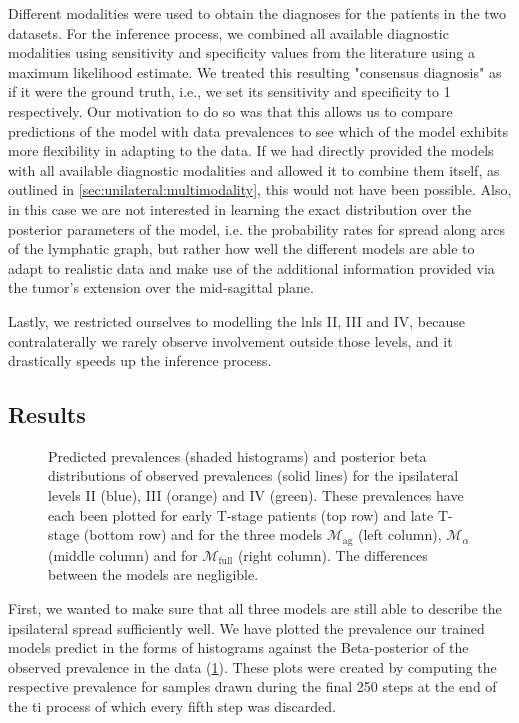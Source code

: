 \documentclass[\relativeRoot/main.tex]{subfiles}
\begin{document}
Different modalities were used to obtain the diagnoses for the patients in the two datasets. For the inference process, we combined all available diagnostic modalities using sensitivity and specificity values from the literature \cite{de_bondt_detection_2007} using a maximum likelihood estimate. We treated this resulting "consensus diagnosis" as if it were the ground truth, i.e., we set its sensitivity and specificity to 1 respectively. Our motivation to do so was that this allows us to compare predictions of the model with data prevalences to see which of the model exhibits more flexibility in adapting to the data. If we had directly provided the models with all available diagnostic modalities and allowed it to combine them itself, as outlined in \cref{sec:unilateral:multimodality}, this would not have been possible. Also, in this case we are not interested in learning the exact distribution over the posterior parameters of the model, i.e. the probability rates for spread along arcs of the lymphatic graph, but rather how well the different models are able to adapt to realistic data and make use of the additional information provided via the tumor's extension over the mid-sagittal plane.

Lastly, we restricted ourselves to modelling the \glspl{lnl} II, III and IV, because contralaterally we rarely observe involvement outside those levels, and it drastically speeds up the inference process.

\subsection{Results}
\label{subsec:bilateral:model_comp:results}

\begin{figure}
    \def\svgwidth{1.0\textwidth}
    
    \caption{
        Predicted prevalences (shaded histograms) and posterior beta distributions of observed prevalences (solid lines) for the ipsilateral levels II (blue), III (orange) and IV (green). These prevalences have each been plotted for early T-stage patients (top row) and late T-stage (bottom row) and for the three models $\mathcal{M}_\text{ag}$ (left column), $\mathcal{M}_\alpha$ (middle column) and for $\mathcal{M}_\text{full}$ (right column). The differences between the models are negligible.
    }
    \label{fig:bilateral:model_comp:ipsi}
\end{figure}

First, we wanted to make sure that all three models are still able to describe the ipsilateral spread sufficiently well. We have plotted the prevalence our trained models predict in the forms of histograms against the Beta-posterior of the observed prevalence in the data (\cref{fig:bilateral:model_comp:ipsi}). These plots were created by computing the respective prevalence for samples drawn during the final 250 steps at the end of the \gls{ti} process of which every fifth step was discarded.
\end{document}
